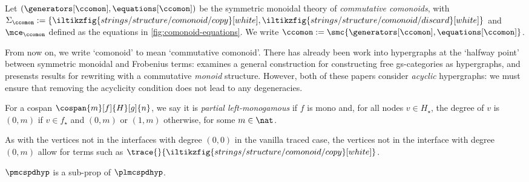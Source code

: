 \begin{definition}
    Let \((\generators[\ccomon], \equations[\ccomon])\) be the symmetric
    monoidal theory of \emph{commutative comonoids}, with \(\Sigma_\ccomon := \{
        \iltikzfig{strings/structure/comonoid/copy}[white],
        \iltikzfig{strings/structure/comonoid/discard}[white]
    \}\) and \(\mce_\ccomon\) defined as the equations in
    \cref{fig:comonoid-equations}.
    We write \(\ccomon := \smc{\generators[\ccomon], \equations[\ccomon]}\).
\end{definition}

From now on, we write `comonoid' to mean `commutative comonoid'.
There has already been work into hypergraphs at the `halfway point' between
symmetric monoidal and Frobenius terms: \cite{fritz2022free} examines a general
construction for constructing free gs-categories as hypergraphs, and
\cite{milosavljevic2022string} presensts results for rewriting with a
commutative \emph{monoid} structure.
However, both of these papers consider \emph{acyclic} hypergraphs: we must
ensure that removing the acyclicity condition does not lead to any degeneracies.

\begin{definition}
    For a cospan \(\cospan{m}[f]{H}[g]{n}\), we say it is
    \emph{partial left-monogamous} if \(f\) is mono and, for all nodes
    \(v \in H_\star\), the degree of \(v\) is \((0,m)\) if \(v \in f_\star\) and
    \((0,m)\) or \((1,m)\) otherwise, for some \(m \in \nat\).
\end{definition}

\begin{remark}
    As with the vertices not in the interfaces with degree \((0, 0)\) in the
    vanilla traced case, the vertices not in the interface with degree
    \((0, m)\) allow for terms such as \(
        \trace{}{\iltikzfig{strings/structure/comonoid/copy}[white]}
    \).
\end{remark}

\begin{lemma}
    \(\pmcspdhyp\) is a sub-prop of \(\plmcspdhyp\).
\end{lemma}

